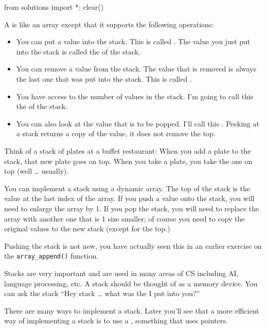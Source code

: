 \begin{python0}
from solutions import *; clear()
\end{python0}

A  is like an array except that it supports the following
operations:

\begin{itemize}
\item
  You can put a value into the stack. This is called . The
  value you just put into the stack is called the  of the
  stack.
\item
  You can remove a value from the stack. The value that is removed is
  always the last one that was put into the stack. This is called
  .
\item
  You have access to the number of values in the stack. I'm going to
  call this the  of the stack.
\item
  You can also look at the value that is to be popped. I'll call this
  . Peeking at a stack returns a copy of the value, it does
  not remove the top.
\end{itemize}

Think of a stack of plates at a buffet restaurant: When you add a plate to the stack, that new plate goes on top. When you take a plate, you take the one on top (well \ldots{} usually).

You can implement a stack using a dynamic array. The top of the stack is the value at the last index of the array. If you push a value onto the stack, you will need to enlarge the array by 1. If you pop the stack, you will need to replace the array with another one that is 1 size smaller; of course you need to copy the original values to the new stack (except for the top.)

Pushing the stack is not new, you have actually seen this in an earlier exercise on the \texttt{array\_append()} function.

Stacks are very important and are used in many areas of CS including AI, language processing, etc. A stack should be thought of as a memory device. You can ask the stack ``Hey stack \ldots{} what was the  I put into you?''


There are many ways to implement a stack. Later you'll see that a more efficient way of implementing a stack is to use a , something that uses pointers.

